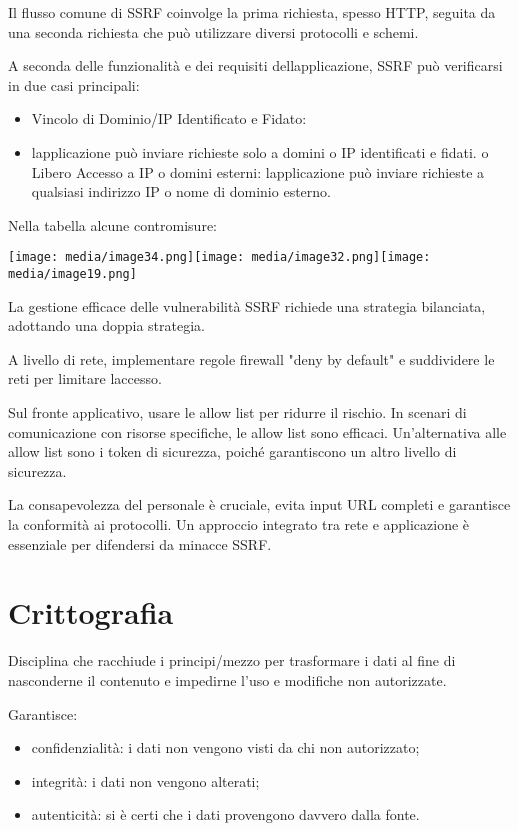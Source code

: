 Il flusso comune di SSRF coinvolge la prima richiesta, spesso HTTP,
seguita da una seconda richiesta che può utilizzare diversi protocolli e
schemi.

A seconda delle funzionalità e dei requisiti
dell\textquotesingle applicazione, SSRF può verificarsi in due casi
principali:

\begin{itemize}
\item
  Vincolo di Dominio/IP Identificato e Fidato:
\item
  l\textquotesingle applicazione può inviare richieste solo a domini o
  IP identificati e fidati. o Libero Accesso a IP o domini esterni:
  l\textquotesingle applicazione può inviare richieste a qualsiasi
  indirizzo IP o nome di dominio esterno.
\end{itemize}

Nella tabella alcune contromisure:

\texttt{[image: media/image34.png]}\texttt{[image: media/image32.png]}\texttt{[image: media/image19.png]}

La gestione efficace delle vulnerabilità SSRF richiede una strategia
bilanciata, adottando una doppia strategia.

A livello di rete, implementare regole firewall "deny by default" e
suddividere le reti per limitare l\textquotesingle accesso.

Sul fronte applicativo, usare le allow list per ridurre il rischio. In
scenari di comunicazione con risorse specifiche, le allow list sono
efficaci. Un'alternativa alle allow list sono i token di sicurezza,
poiché garantiscono un altro livello di sicurezza.

La consapevolezza del personale è cruciale, evita input URL completi e
garantisce la conformità ai protocolli. Un approccio integrato tra rete
e applicazione è essenziale per difendersi da minacce SSRF.

\section{Crittografia}\label{crittografia}

Disciplina che racchiude i principi/mezzo per trasformare i dati al fine
di nasconderne il contenuto e impedirne l'uso e modifiche non
autorizzate.

Garantisce:

\begin{itemize}
\item
  confidenzialità: i dati non vengono visti da chi non autorizzato;
\item
  integrità: i dati non vengono alterati;
\item
  autenticità: si è certi che i dati provengono davvero dalla fonte.
\end{itemize}

